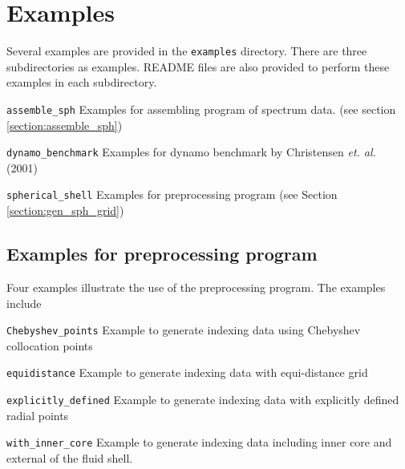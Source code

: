 \section{Examples}
Several examples are provided in the \verb|examples| directory. There are three subdirectories as examples. README files are also provided to perform these examples in each subdirectory.
%
\begin{description}
\item{\tt assemble\_sph}    Examples for assembling program of spectrum data. (see section \ref{section:assemble_sph})
\item{\tt dynamo\_benchmark} Examples for dynamo benchmark by Christensen {\it et. al.} (2001)
\item{\tt spherical\_shell} Examples for preprocessing program (see Section \ref{section:gen_sph_grid})
\end{description}
%

\subsection{Examples for preprocessing program}
Four examples illustrate the use of the preprocessing program. The examples include
%
\begin{description}
\item{\tt Chebyshev\_points}   Example to generate indexing data using Chebyshev collocation points
\item{\tt equidistance}        Example to generate indexing data with equi-distance grid
\item{\tt explicitly\_defined} Example to generate indexing data with explicitly defined radial points
\item{\tt with\_inner\_core}   Example to generate indexing data including inner core and external of the fluid shell.
\end{description}
%
